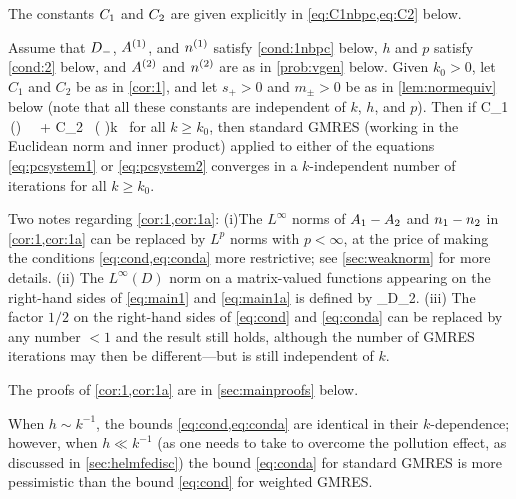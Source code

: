 The constants $C_{1}$ and $C_{2}$ are given explicitly  in \cref{eq:C1nbpc,eq:C2} below.

\label{cor:1a}
Assume that $D_{-}$, ${A}^{(1)}$, and ${n}^{(1)}$ satisfy \cref{cond:1nbpc} below, $h$ and $p$ satisfy \cref{cond:2} below, and ${A}^{(2)}$ and ${n}^{(2)}$ are as in \cref{prob:vgen} below. Given $k_0>0$,
let $C_1$ and $C_2$ be as in \cref{cor:1}, and let $s_{+}>0$ and $m_{\pm}>0$ be as in \cref{lem:normequiv} below (note that all these constants are independent of $k$, $h$, and $p$). Then if 
\beq\label{eq:conda}
 C_1 \,\left(\right) \, \,
\NLiDRRdtd{\Aso-\Ast} + C_2 \, \left( \right)k \, \NLiDRR{\nso-\nst}
\leq {}
\eeq
for all $k\geq k_0$, then standard GMRES (working in the Euclidean norm and inner product) applied to either of the equations \cref{eq:pcsystem1} or \cref{eq:pcsystem2}
 converges in a $k$-independent number of iterations for all $k\geq k_0$.
\enth

Two notes regarding \cref{cor:1,cor:1a}: (i)The $L^\infty$ norms of $A_{1}-A_{2}$ and $n_{1}-n_{2}$ in \cref{cor:1,cor:1a} can be replaced by $L^p$ norms with $p < \infty$, at the price of making the conditions \cref{eq:cond,eq:conda} more restrictive; see \cref{sec:weaknorm} for more details. (ii) The $L^\infty(D)$ norm on a matrix-valued functions appearing on the right-hand sides of \cref{eq:main1} and \cref{eq:main1a} is defined by
\beqs
{}\de \esssup_{\bx\in D}_2.
\eeqs
(iii) The factor $1/2$ on the right-hand sides of \cref{eq:cond} and \cref{eq:conda} can be replaced by any number $<1$ and the result still holds, although the number of GMRES iterations may then be different---but is still independent of $k$.

The proofs of \cref{cor:1,cor:1a} are in \cref{sec:mainproofs} below.

\bre
When $h\sim  k^{-1}$, the bounds \cref{eq:cond,eq:conda} are identical in their $k$-dependence; however, when $h\ll k^{-1}$ (as one needs to take to overcome the pollution effect, as discussed in \cref{sec:helmfedisc}) the bound \cref{eq:conda} for standard GMRES is more pessimistic than the bound \cref{eq:cond} for weighted GMRES.
\ere



